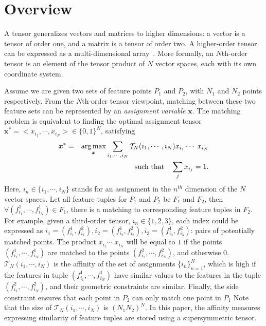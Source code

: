\section{Overview}
\label{sec:overview}

A tensor generalizes vectors and matrices to higher dimensions: a vector is a tensor of order one,
and a matrix is a tensor of order two. A higher-order tensor can be expressed as a multi-dimensional array~\cite{Kolda08}.
More formally, an $N$th-order tensor is an element of the tensor product of $N$ vector spaces, each with its own coordinate system.

Assume we are given two sets of feature points $P_1$ and $P_2$, with $N_1$ and $N_2$ points respectively.
From the $N$th-order tensor viewpoint, matching between these two feature sets can be represented by an \emph{assignment variable} $\boldsymbol{x}$.
The matching problem is equivalent to finding the optimal assignment tensor ${\boldsymbol{x}}^*=<x_{i_1},\cdots,x_{i_N}>
 \in \{0,1\}^{N}$, satisfying~\cite{Kolda08,Duchenne09}
\begin{eqnarray}
\label{equ:assigment}
  {\boldsymbol{x}}^* = &&\operatorname*{arg\,max}_{\boldsymbol{x}}  \sum_{i_1,\cdots,i_N} \mathcal{T}_N(i_1,\cdots,i_N) x_{i_1}  \cdots\; x_{i_N}\\
 && \textrm{such that}\quad \sum_j x_{i_j} = 1.\nonumber
\end{eqnarray}
Here, $i_n \in \{i_1,\cdots ,i_N\}$ stands for an assignment in the $n^{th}$ dimension of the $N$ vector spaces.
Let all feature tuples for $P_1$ and $P_2$ be $F_1$ and $F_2$, then $\forall (f_{i_1}^1, \cdots, f_{i_N}^1)\in F_1$,
there is a matching to corresponding feature tuples in $F_2$.
For example, given a third-order tensor, $i_n \in \{1,2,3\}$,
each index could be expressed as $i_1=(f_{i_1}^1,f_{i_1}^2), i_2=(f_{i_2}^1,f_{i_2}^2), i_3=(f_{i_3}^1,f_{i_3}^2)$: pairs of potentially matched points.
The product $x_{i_1} \cdots\;x_{i_N}$ will be equal to $1$ if the points $(f_{i_1}^1, \cdots, f_{i_N}^1)$ are matched to the points $(f_{i_1}^2, \cdots, f_{i_N}^2)$,
and otherwise 0.
$\mathcal{T}_N(i_1,\cdots,i_N)$ is the affinity of the set of assignments $\{i_n\}_{n=1}^N$,
which is high if the features in tuple $(f_{i_1}^1, \cdots, f_{i_N}^1)$  have similar values to the features in the tuple $(f_{i_1}^2, \cdots, f_{i_N}^2)$, 
and their geometric constraints are similar.
Finally, the side constraint ensures that each point in $P_2$ can only match one point in $P_1$
Note that the size of $\mathcal{T}_N(i_1,\cdots,i_N)$ is ${(N_1N_2)}^N$.
In this paper, the affinity measures expressing similarity of feature tuples are stored using a supersymmetric tensor.

